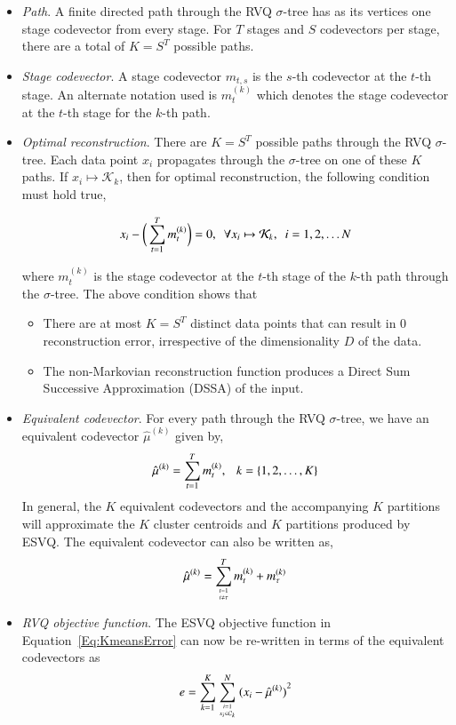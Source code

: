 \begin{Body}
\begin{itemize}
\item \emph{Path}.  A finite directed path through the RVQ $\sigma$-tree has as its vertices one stage codevector from every stage.  For $T$ stages and $S$ codevectors per stage, there are a total of $K = S^T$ possible paths.
\item \emph{Stage codevector}.  A stage codevector $m_{t, s}$ is the $s$-th codevector at the $t$-th stage.  An alternate notation used is $m^{(k)}_t$ which denotes the stage codevector at the $t$-th stage for the $k$-th path.
\item \emph{Optimal reconstruction}.  There are $K=S^T$ possible paths through the RVQ $\sigma$-tree.  Each data point $x_i$ propagates through the $\sigma$-tree on one of these $K$ paths.  If $x_i \mapsto \mathcal{K}_k$, then for optimal reconstruction, the following condition must hold true,

\begin{equation*}
x_i -\bigg(\sum_{t=1}^Tm^{(k)}_t\bigg) = 0, \ \ \forall x_i \mapsto \mathcal{K}_k, \ \ i =1, 2, \ldots N\\
\end{equation*}

where $m^{(k)}_t$ is the stage codevector at the $t$-th stage of the $k$-th path through the $\sigma$-tree.  The above condition shows that

\begin{itemize} 
\item There are at most $K=S^T$ distinct data points that can result in 0 reconstruction error, irrespective of the dimensionality $D$ of the data. 
\item The non-Markovian reconstruction function produces a Direct Sum Successive Approximation (DSSA) of the input.
\end{itemize}\item \emph{Equivalent codevector}.  For every path through the RVQ $\sigma$-tree, we have an equivalent codevector $\hat{\mu}^{(k)}$ given by,
\begin{equation}
\hat{\mu}^{(k)} = \sum_{t=1 }^Tm^{(k)}_t, \ \ \ k=\{1, 2, \ldots, K\}
\end{equation}
In general, the $K$ equivalent codevectors and the accompanying $K$ partitions will approximate the $K$ cluster centroids and $K$ partitions produced by ESVQ.  The equivalent codevector can also be written as,
\begin{equation}
\label{Eq:RVQequivalentCodevectorBroken}
\hat{\mu}^{(k)} = \sum_{t=1 \atop t \neq \tau}^Tm^{(k)}_t+ m^{(k)}_\tau
\end{equation}
\item \emph{RVQ objective function}.  The ESVQ objective function in Equation~\ref{Eq:KmeansError} can now be re-written in terms of the equivalent codevectors as 
\begin{equation}
e = \sum\limits_{k=1}^K \sum\limits_{{i=1 \atop x_i \in \mathcal{C}_k}}^N {(x_i - \hat{\mu}^{(k)})}^2
\end{equation}
\end{itemize}


\end{Body}
